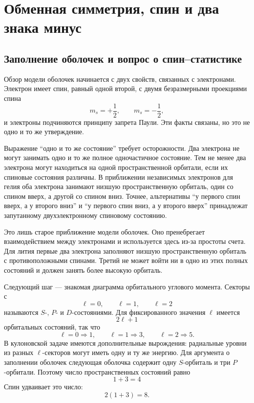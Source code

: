 \chapter{Обменная симметрия, спин и два знака минус}

\section{Заполнение оболочек и вопрос о спин--статистике}

Обзор модели оболочек начинается с двух свойств, связанных с электронами. Электрон имеет спин, равный одной второй, с двумя безразмерными проекциями спина
\begin{equation}
m_s=+\frac12,
\qquad
m_s=-\frac12,
\end{equation}
и электроны подчиняются принципу запрета Паули. Эти факты связаны, но это не одно и то же утверждение.

Выражение ``одно и то же состояние'' требует осторожности. Два электрона не могут занимать одно и то же полное одночастичное состояние. Тем не менее два электрона могут находиться на одной пространственной орбитали, если их спиновые состояния различны. В приближении независимых электронов для гелия оба электрона занимают низшую пространственную орбиталь, один со спином вверх, а другой со спином вниз. Точнее, альтернативы ``у первого спин вверх, а у второго вниз'' и ``у первого спин вниз, а у второго вверх'' принадлежат запутанному двухэлектронному спиновому состоянию.

Это лишь старое приближение модели оболочек. Оно пренебрегает взаимодействием между электронами и используется здесь из-за простоты счета. Для лития первые два электрона заполняют низшую пространственную орбиталь с противоположными спинами. Третий не может войти ни в одно из этих полных состояний и должен занять более высокую орбиталь.

Следующий шаг — знакомая диаграмма орбитального углового момента. Секторы с
\begin{equation}
\ell=0,\qquad \ell=1,\qquad \ell=2
\end{equation}
называются \(S\)-, \(P\)- и \(D\)-состояниями. Для фиксированного значения \(\ell\) имеется
\begin{equation}
2\ell+1
\end{equation}
орбитальных состояний, так что
\begin{equation}
\ell=0\Rightarrow 1,
\qquad
\ell=1\Rightarrow 3,
\qquad
\ell=2\Rightarrow 5.
\end{equation}
В кулоновской задаче имеются дополнительные вырождения: радиальные уровни из разных \(\ell\)-секторов могут иметь одну и ту же энергию. Для аргумента о заполнении оболочек следующая оболочка содержит одну \(S\)-орбиталь и три \(P\)-орбитали. Поэтому число пространственных состояний равно
\begin{equation}
1+3=4
\end{equation}
Спин удваивает это число:
\begin{equation}
2(1+3)=8.
\end{equation}


